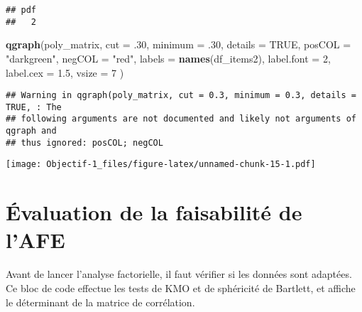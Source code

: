 \documentclass[
]{article}
\newenvironment{Shaded}{\begin{snugshade}}{\end{snugshade}}
\newcommand{\AttributeTok}[1]{\textcolor[rgb]{0.13,0.29,0.53}{#1}}
\newcommand{\ConstantTok}[1]{\textcolor[rgb]{0.56,0.35,0.01}{#1}}
\newcommand{\DecValTok}[1]{\textcolor[rgb]{0.00,0.00,0.81}{#1}}
\newcommand{\FloatTok}[1]{\textcolor[rgb]{0.00,0.00,0.81}{#1}}
\newcommand{\FunctionTok}[1]{\textcolor[rgb]{0.13,0.29,0.53}{\textbf{#1}}}
\newcommand{\NormalTok}[1]{#1}
\newcommand{\StringTok}[1]{\textcolor[rgb]{0.31,0.60,0.02}{#1}}
\begin{document}
\begin{verbatim}
## pdf 
##   2
\end{verbatim}

\begin{Shaded}
\begin{Highlighting}[]
\FunctionTok{qgraph}\NormalTok{(poly\_matrix,}
       \AttributeTok{cut =}\NormalTok{ .}\DecValTok{30}\NormalTok{,}
       \AttributeTok{minimum =}\NormalTok{ .}\DecValTok{30}\NormalTok{,}
       \AttributeTok{details =} \ConstantTok{TRUE}\NormalTok{,}
       \AttributeTok{posCOL =} \StringTok{"darkgreen"}\NormalTok{,}
       \AttributeTok{negCOL =} \StringTok{"red"}\NormalTok{,}
       \AttributeTok{labels =} \FunctionTok{names}\NormalTok{(df\_items2),}
       \AttributeTok{label.font =} \DecValTok{2}\NormalTok{,}
       \AttributeTok{label.cex =} \FloatTok{1.5}\NormalTok{,}
       \AttributeTok{vsize =} \DecValTok{7}
\NormalTok{)}
\end{Highlighting}
\end{Shaded}

\begin{verbatim}
## Warning in qgraph(poly_matrix, cut = 0.3, minimum = 0.3, details = TRUE, : The
## following arguments are not documented and likely not arguments of qgraph and
## thus ignored: posCOL; negCOL
\end{verbatim}

\texttt{[image: Objectif-1\_files/figure-latex/unnamed-chunk-15-1.pdf]}

\section{Évaluation de la faisabilité de
l'AFE}\label{uxe9valuation-de-la-faisabilituxe9-de-lafe}

Avant de lancer l'analyse factorielle, il faut vérifier si les données
sont adaptées. Ce bloc de code effectue les tests de KMO et de
sphéricité de Bartlett, et affiche le déterminant de la matrice de
corrélation.
\end{document}
